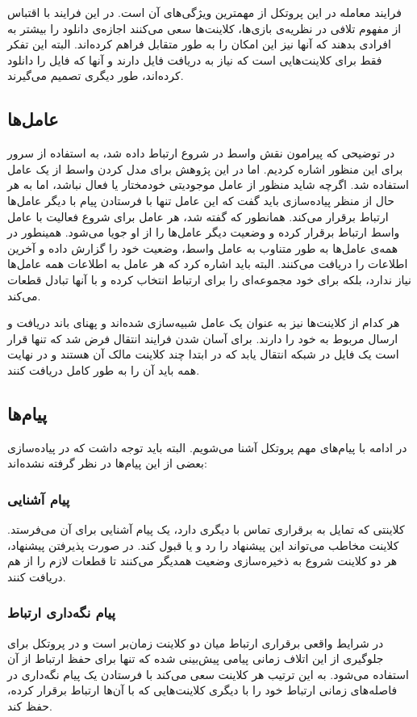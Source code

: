 \documentclass{report}
\begin{document}
فرایند معامله در این پروتکل از مهمترین ویژگی‌های آن است. در این فرایند با اقتباس از مفهوم تلافی در نظریه‌ی بازی‌ها، کلاینت‌ها سعی می‌کنند اجازه‌ی دانلود را بیشتر به افرادی بدهند که آنها نیز این امکان را به طور متقابل فراهم کرده‌اند. البته این تفکر فقط برای کلاینت‌هایی است که نیاز به دریافت فایل دارند و آنها که فایل را دانلود کرده‌اند، طور دیگری تصمیم می‌گیرند.

\subsection{عامل‌ها}
در توضیحی که پیرامون نقش واسط در شروع ارتباط داده شد، به استفاده از سرور برای این منظور اشاره کردیم. اما در این پژوهش برای مدل کردن واسط از یک عامل استفاده شد. اگرچه شاید منظور از عامل موجودیتی خودمختار یا فعال نباشد، اما به هر حال از منظر پیاده‌سازی باید گفت که این عامل تنها با فرستادن پیام با دیگر عامل‌ها ارتباط برقرار می‌کند. همانطور که گفته شد، هر عامل برای شروع فعالیت با عامل واسط ارتباط برقرار کرده و وضعیت دیگر عامل‌ها را از او جویا می‌شود. همینطور در همه‌ی عامل‌ها به طور متناوب به عامل واسط، وضعیت خود را گزارش داده و آخرین اطلاعات را دریافت می‌کنند. البته باید اشاره کرد که هر عامل به اطلاعات همه عامل‌ها نیاز ندارد، بلکه برای خود مجموعه‌ای را برای ارتباط انتخاب کرده و با آنها تبادل قطعات می‌کند.

هر کدام از کلاینت‌ها نیز به عنوان یک عامل شبیه‌سازی شده‌اند و پهنای باند دریافت و ارسال مربوط به خود را دارند. برای آسان شدن فرایند انتقال فرض شد که تنها قرار است یک فایل در شبکه انتقال یابد که در ابتدا چند کلاینت مالک آن هستند و در نهایت همه باید آن را به طور کامل دریافت کنند.

\subsection{پیام‌ها}
در ادامه با پیام‌های مهم پروتکل آشنا می‌شویم. البته باید توجه داشت که در پیاده‌سازی بعضی از این پیام‌ها در نظر گرفته نشده‌اند:

\subsubsection{پیام آشنایی}
کلاینتی که تمایل به برقراری تماس با دیگری دارد، یک پیام آشنایی برای آن می‌فرستد. کلاینت مخاطب می‌تواند این پیشنهاد را رد و یا قبول کند. در صورت پذیرفتن پیشنهاد، هر دو کلاینت شروع به ذخیره‌سازی وضعیت همدیگر می‌کنند تا قطعات لازم را از هم دریافت کنند.

\subsubsection{پیام نگه‌داری ارتباط}
در شرایط واقعی برقراری ارتباط میان دو کلاینت زمان‌بر است و در  پروتکل برای جلوگیری از این اتلاف زمانی پیامی پیش‌بینی شده که تنها برای حفظ ارتباط از آن استفاده می‌شود. به این ترتیب هر کلاینت سعی می‌کند با فرستادن یک پیام نگه‌داری در فاصله‌های زمانی ارتباط خود را با دیگری کلاینت‌هایی که با آن‌ها ارتباط برقرار کرده، حفظ کند.
\end{document}
